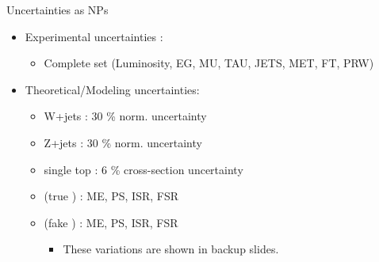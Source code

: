 \documentclass[aspectratio=46, dvipdfmx, 10pt, t]{beamer} %
\begin{document}
\begin{frame}{Uncertainties as NPs}
  \vspace{5mm}
  \begin{itemize}
    \item Experimental uncertainties :
      \begin{itemize}
        \item Complete set (Luminosity, EG, MU, TAU, JETS, MET, FT, PRW)
      \end{itemize}
      \vspace{5mm}

    \item Theoretical/Modeling uncertainties:
      \begin{itemize}
        \item W+jets : 30 \% norm. uncertainty
        \item Z+jets : 30 \% norm. uncertainty
        \item single top : 6 \% cross-section uncertainty
        \item \ttbar (true \tauhad) : ME, PS, ISR, FSR 
        \item \ttbar (fake \tauhad) : ME, PS, ISR, FSR
          \begin{itemize}
            \item These variations are shown in backup slides. \hyperlink{backup}{}
          \end{itemize}
      \end{itemize}
  \end{itemize}
\end{frame}
\end{document}
